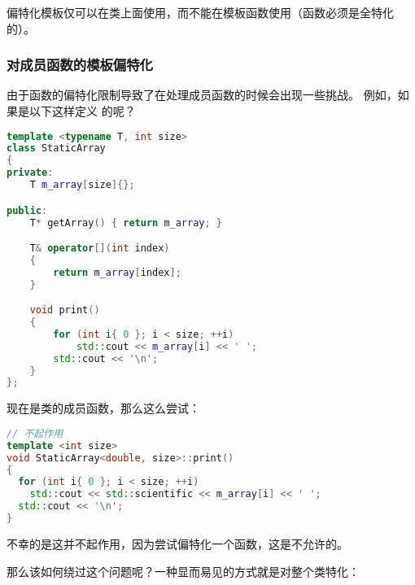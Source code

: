 \documentclass[../../LearnCpp.tex]{subfiles}
\begin{document}
偏特化模板仅可以在类上面使用，而不能在模板函数使用（函数必须是全特化的）。

\subsubsection*{对成员函数的模板偏特化}

由于函数的偏特化限制导致了在处理成员函数的时候会出现一些挑战。
例如，如果是以下这样定义  的呢？

\begin{lstlisting}[language=C++]
template <typename T, int size>
class StaticArray
{
private:
    T m_array[size]{};

public:
    T* getArray() { return m_array; }

    T& operator[](int index)
    {
        return m_array[index];
    }

    void print()
    {
        for (int i{ 0 }; i < size; ++i)
            std::cout << m_array[i] << ' ';
        std::cout << '\n';
    }
};
\end{lstlisting}

 现在是类的成员函数，那么这么尝试：

\begin{lstlisting}[language=C++]
// 不起作用
template <int size>
void StaticArray<double, size>::print()
{
  for (int i{ 0 }; i < size; ++i)
    std::cout << std::scientific << m_array[i] << ' ';
  std::cout << '\n';
}
\end{lstlisting}

不幸的是这并不起作用，因为尝试偏特化一个函数，这是不允许的。

那么该如何绕过这个问题呢？一种显而易见的方式就是对整个类特化：
\end{document}
